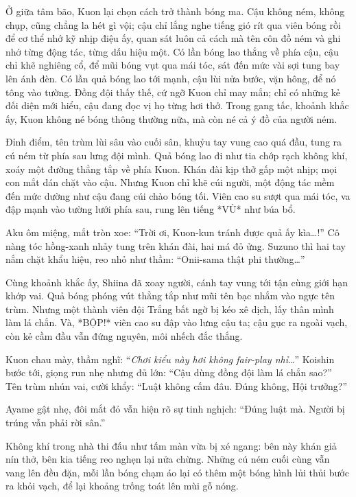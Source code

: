 \documentclass[../main.tex]{subfiles}
\begin{document}
Ở giữa tâm bão, Kuon lại chọn cách trở thành bóng ma. Cậu không ném, không chụp, cũng chẳng la hét gì vội; cậu chỉ lắng nghe tiếng gió rít qua viên bóng rồi để cơ thể nhớ kỹ nhịp điệu ấy, quan sát luôn cả cách mà tên côn đồ ném và ghi nhớ từng động tác, từng dấu hiệu một. Có lần bóng lao thẳng về phía cậu, cậu chỉ khẽ nghiêng cổ, để mũi bóng vụt qua mái tóc, sát đến mức vài sợi tung bay lên ánh đèn. Có lần quả bóng lao tới mạnh, cậu lùi nửa bước, vặn hông, để nó tông vào tường. Đồng đội thấy thế, cứ ngỡ Kuon chỉ may mắn; chỉ có những kẻ đối diện mới hiểu, cậu đang đọc vị họ từng hơi thở. Trong gang tấc, khoảnh khắc ấy, Kuon không né bóng thông thường nữa, mà còn né cả ý đồ của người ném.

Đỉnh điểm, tên trùm lùi sâu vào cuối sân, khuỷu tay vung cao quá đầu, tung ra cú ném từ phía sau lưng đội mình. Quả bóng lao đi như tia chớp rạch không khí, xoáy một đường thẳng tắp về phía Kuon. Khán đài kịp thở gấp một nhịp; mọi con mắt dán chặt vào cậu. Nhưng Kuon chỉ khẽ cúi người, một động tác mềm đến mức dường như cậu đang cúi chào bóng tối. Viên cao su sượt qua mái tóc, va đập mạnh vào tường lưới phía sau, rung lên tiếng *VÙ* như búa bổ.

Aku ôm miệng, mắt tròn xoe: ``Trời ơi, Kuon-kun tránh được quả ấy kìa\dots!'' Cô nàng tóc hồng-xanh nhảy tung trên khán đài, hai má đỏ ửng. Suzuno thì hai tay nắm chặt khẩu hiệu, reo nhỏ như thầm: ``Onii-sama thật phi thường\dots''

Cùng khoảnh khắc ấy, Shiina đã xoay người, cánh tay vung tới tận cùng giới hạn khớp vai. Quả bóng phóng vút thẳng tắp như mũi tên bạc nhắm vào ngực tên trùm. Nhưng một thành viên đội Trắng bất ngờ bị kéo xê dịch, lấy thân mình làm lá chắn. Và, *BỘP!* viên cao su đập vào lưng cậu ta; cậu gục ra ngoài vạch, còn kẻ cầm đầu vẫn đứng nguyên, môi nhếch đắc thắng.

Kuon chau mày, thầm nghĩ: ``\textit{Chơi kiểu này hơi không fair-play nhỉ\dots}'' Koishin bước tới, giọng run nhẹ nhưng đủ lớn: ``Cậu dùng đồng đội làm lá chắn sao?'' Tên trùm nhún vai, cười khẩy: ``Luật không cấm đâu. Đúng không, Hội trưởng?''

Ayame gật nhẹ, đôi mắt đỏ vẫn hiện rõ sự tinh nghịch: ``Đúng luật mà. Người bị trúng vẫn phải rời sân.''

Không khí trong nhà thi đấu như tấm màn vừa bị xé ngang: bên này khán giả nín thở, bên kia tiếng reo nghẹn lại nửa chừng. Những cú ném cuối cùng vẫn vang lên đều đặn, mỗi lần bóng chạm áo lại có thêm một bóng hình lủi thủi bước ra khỏi vạch, để lại khoảng trống toát lên mùi gỗ nóng.
\end{document}
